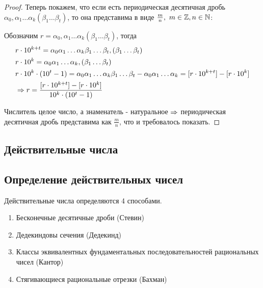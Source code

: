 \begin{proof}
    Теперь покажем, что если есть периодическая десятичная
    дробь $\alpha_0, \alpha_1 \dots \alpha_k (\beta_1 \dots
    \beta_t)$, то она представима в виде
    $\frac{m}{n},\ m \in \mathbb{Z}, n \in \mathbb{N}$:
    
    Обозначим $r = \alpha_0, \alpha_1 \dots \alpha_k
    (\beta_1 \dots \beta_t)$, тогда
    \begin{align*}
        &r \cdot 10^{k + t}= \alpha_0 \alpha_1
            \dots \alpha_k \beta_1 \dots \beta_t,
            (\beta_1 \dots \beta_t) \\
        &r \cdot 10^k= \alpha_0 \alpha_1 \dots
            \alpha_k,(\beta_1 \dots \beta_t) \\
        &r \cdot 10^k \cdot (10^t - 1) = \alpha_0
            \alpha_1 \dots \alpha_k \beta_1 \dots \beta_t - \alpha_0 \alpha_1 \dots \alpha_k = [r \cdot 10^{k + t}] - [r \cdot 10^k] \\
        &\Rightarrow r = \frac{[r \cdot 10^{k + t}] -
            [r \cdot 10^k]}{10^k \cdot (10^t - 1)}
    \end{align*}
    
    Числитель целое число, а знаменатель - натуральное
    $\Rightarrow$ периодическая десятичная дробь представима как
    $\frac{m}{n}$, что и требовалось показать.
\end{proof}

\subsection{Действительные числа}


\subsection*{Определение действительных чисел}

\begin{definition}
    Действительные числа определяются 4 способами.

    \begin{enumerate}
        \item Бесконечные десятичные дроби (Стевин)
        \item Дедекиндовы сечения (Дедекинд)
        \item Классы эквивалентных фундаментальных
            последовательностей рациональных
            чисел (Кантор)
        \item Стягивающиеся рациональные отрезки (Бахман)
    \end{enumerate}
\end{definition}

